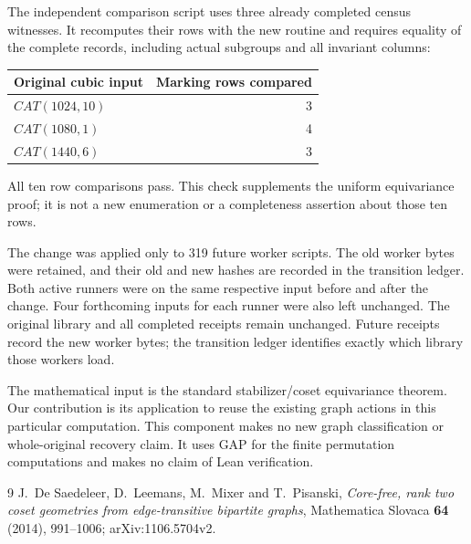 \documentclass[11pt,a4paper]{article}
\begin{document}
The independent comparison script uses three already completed
census witnesses. It recomputes their rows with the new routine
and requires equality of the complete records, including actual
subgroups and all invariant columns:
\begin{center}
\begin{tabular}{lr}
\toprule
Original cubic input & Marking rows compared\\
\midrule
$CAT(1024,10)$ & 3\\
$CAT(1080,1)$ & 4\\
$CAT(1440,6)$ & 3\\
\bottomrule
\end{tabular}
\end{center}
All ten row comparisons pass. This check supplements the uniform
equivariance proof; it is not a new enumeration or a completeness
assertion about those ten rows.

The change was applied only to 319 future worker scripts. The
old worker bytes were retained, and their old and new hashes are
recorded in the transition ledger. Both active runners were on
the same respective input before and after the change. Four
forthcoming inputs for each runner were also left unchanged.
The original library and all completed receipts remain unchanged.
Future receipts record the new worker bytes; the transition ledger
identifies exactly which library those workers load.

The mathematical input is the standard stabilizer/coset
equivariance theorem. Our contribution is its application to
reuse the existing graph actions in this particular computation.
This component makes no new graph classification or whole-original
recovery claim. It uses GAP for the finite permutation computations
and makes no claim of Lean verification.

\begin{thebibliography}{9}
 J.~De Saedeleer, D.~Leemans, M.~Mixer and
T.~Pisanski, \emph{Core-free, rank two coset geometries from
edge-transitive bipartite graphs}, Mathematica Slovaca
\textbf{64} (2014), 991--1006; arXiv:1106.5704v2.
\end{thebibliography}
\end{document}
